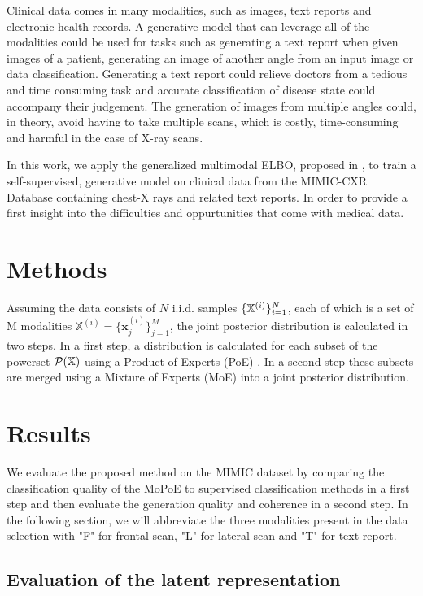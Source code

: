 \documentclass{midl} %
\begin{document}
	Clinical data comes in many modalities, such as images, text reports and electronic health records.
	A generative model that can leverage all of the modalities could be used for tasks such as generating a text report when given images of a patient, generating an image of another angle from an input image or data classification.
	Generating a text report could relieve doctors from a tedious and time consuming task and accurate classification of disease state could accompany their judgement.
	The generation of images from multiple angles could, in theory, avoid having to take multiple scans, which is costly, time-consuming and harmful in the case of X-ray scans.

	In this work, we apply the generalized multimodal ELBO, proposed in \cite{thomas_gener-ELBO}, to train a self-supervised, generative model on clinical data from the MIMIC-CXR Database \cite{johnson2019mimic} containing chest-X rays and related text reports. In order to provide a first insight into the difficulties and oppurtunities that come with medical data.

\section{Methods}
Assuming the data consists of $N$ i.i.d. samples $\{\mathbb{X}^{(i)}\}^N_{i=1}$, each of which is a set of M modalities $\mathbb{X}^{(i)} = \{\textbf{x}_j^{(i)}\}^M_{j=1}$, the joint posterior distribution is calculated in two steps.
In a first step, a distribution is calculated for each subset of the powerset $\mathcal{P}(\mathbb{X})$ using a Product of Experts (PoE) \cite{wu2018multimodal}.
In a second step these subsets are merged using a Mixture of Experts (MoE) \cite{shi2019variational} into a joint posterior distribution.

\section{Results}

    We evaluate the proposed method on the MIMIC dataset by comparing the classification quality of the MoPoE to supervised classification methods in a first step and then evaluate the generation quality and coherence in a second step.
    In the following section, we will abbreviate the three modalities present in the data selection with "F" for frontal scan, "L" for lateral scan and "T" for text report.
    
    
    
    \subsection{Evaluation of the latent representation}
    
\end{document}
